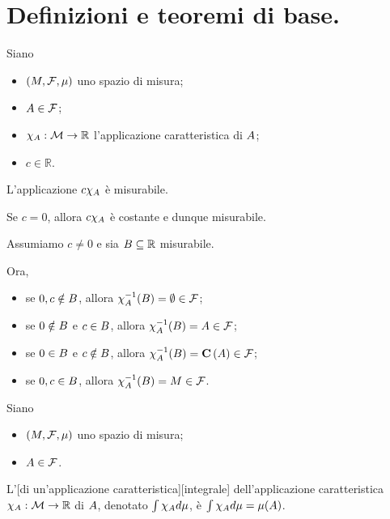 \section{Definizioni e teoremi di base.}
\label{Integrali_DefinizioniETeoremiDiBase}
\begin{Theorem}
\label{Misura_th_ApplicazioneCaratteristica}
  Siano
  \begin{itemize}
    \item $(M,\mathcal{F},\mu)$ uno spazio di misura;
    \item $A \in \mathcal{F}$;
    \item $\chi_{A}:
      \mathcal{M} \rightarrow \mathbb{R}$
      l'applicazione caratteristica
      di $A$;
    \item $c \in \mathbb{R}$.
  \end{itemize}
  L'applicazione $c \chi_{A}$ \`e misurabile.
\end{Theorem}
\Proof Se $c = 0$, allora $c \chi_{A}$ \`e
costante e dunque misurabile.
\par Assumiamo $c \neq 0$ e sia $B \subseteq \mathbb{R}$
misurabile.
\par Ora,
\begin{itemize}
  \item se $0, c \notin B$, allora
    $\chi_{A}^{-1} (B)
    = \emptyset \in \mathcal{F}$;
  \item se $0 \notin B$ e $c \in B$, allora
    $\chi_{A}^{-1} (B)
    = A \in \mathcal{F}$;
  \item se $0 \in B$ e $c \notin B$, allora
    $\chi_{A}^{-1} (B)
    = \mathbf{C} \left ( A \right ) \in \mathcal{F}$;
  \item se $0, c \in B$, allora
    $\chi_{A}^{-1} (B)
    = M \in \mathcal{F}$. \EndProof
\end{itemize}
\begin{Definition}
  Siano
  \begin{itemize}
    \item $(M,\mathcal{F},\mu)$ uno spazio di misura;
    \item $A \in \mathcal{F}$.
  \end{itemize}
  L'[di un'applicazione caratteristica][integrale]
  dell'applicazione caratteristica
  $\chi_{A}:
  \mathcal{M} \rightarrow \mathbb{R}$
  di $A$, denotato
  $\int \chi_{A} d\mu$, \`e 
  $\int \chi_{A} d\mu
  = \mu(A)$.
\end{Definition}
